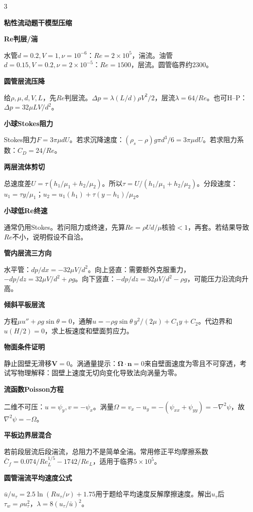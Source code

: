 \documentclass[a4paper]{article}
\newcommand{\qt}[1]{\vspace{0.25pt}\colorbox{Q}{\parbox{\dimexpr\linewidth-2\fboxsep}{\color{white}\bfseries #1}}\par}
\newcommand{\sect}[1]{\qt{#1}}
\begin{document}
\begin{multicols}{3}
{\sect{粘性流动题干模型压缩}
\sect{Re判层/湍}
水管$d=0.2,V=1,\nu=10^{-6}$：$Re=2\times10^5$，湍流。油管$d=0.15,V=0.2,\nu=2\times10^{-5}$：$Re=1500$，层流。圆管临界约2300。
\sect{圆管层流压降}
给$\rho,\mu,d,V,L$，先$Re$判层流。$\Delta p=\lambda(L/d)\rho V^2/2$，层流$\lambda=64/Re$。也可H--P：$\Delta p=32\mu LV/d^2$。
\sect{小球Stokes阻力}
Stokes阻力$F=3\pi\mu dU$。若求沉降速度：$(\rho_s-\rho)g\pi d^3/6=3\pi\mu dU$。若求阻力系数：$C_D=24/Re$。
\sect{两层流体剪切}
总速度差$U=\tau(h_1/\mu_1+h_2/\mu_2)$。所以$\tau=U/(h_1/\mu_1+h_2/\mu_2)$。分段速度：$u_1=\tau y/\mu_1$；$u_2=u_1(h_1)+\tau(y-h_1)/\mu_2$。
\sect{小球低Re终速}
通常仍用Stokes。若问阻力或终速，先算$Re=\rho Ud/\mu$核验$<1$，再套。若结果导致$Re$不小，说明假设不自洽。
\sect{管内层流三方向}
水平管：$dp/dx=-32\mu V/d^2$。向上竖直：需要额外克服重力，$-dp/dz=32\mu V/d^2+\rho g$。向下竖直：$-dp/dz=32\mu V/d^2-\rho g$，可能压力沿流向升高。
\sect{倾斜平板层流}
方程$\mu u''+\rho g\sin\theta=0$，通解$u=-\rho g\sin\theta\,y^2/(2\mu)+C_1y+C_2$。代边界和$u(H/2)=0$，求上板速度和壁面剪应力。
\sect{物面条件证明}
静止固壁无滑移$\bm V=0$。涡通量提示：$\bm\Omega\cdot\bm n=0$来自壁面速度为零且不可穿透，考试写物理解释：固壁上速度无切向变化导致法向涡量为零。
\sect{流函数Poisson方程}
二维不可压：$u=\psi_y,v=-\psi_x$。涡量$\Omega=v_x-u_y=-(\psi_{xx}+\psi_{yy})=-\nabla^2\psi$，故$\nabla^2\psi=-\Omega$。
\sect{平板边界层混合}
若前段层流后段湍流，总阻力不是简单全湍。常用修正平均摩擦系数$\bar C_f=0.074/Re_L^{1/5}-1742/Re_L$，适用于临界$5\times10^5$。
\sect{圆管湍流平均速度公式}
$\bar u/u_\tau=2.5\ln(Ru_\tau/\nu)+1.75$用于题给平均速度反解摩擦速度。解出$u_\tau$后$\tau_w=\rho u_\tau^2$，$\lambda=8(u_\tau/\bar u)^2$。

}
\end{multicols}
\end{document}
